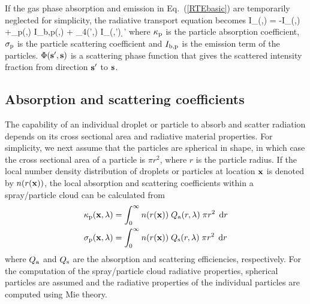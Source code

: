 If the gas phase absorption and emission in Eq.~(\ref{RTEbasic}) are temporarily neglected for simplicity, the radiative transport
equation becomes
\be
\bs \cdot \nabla I_{\la}(\bx,\bs) = -
I_{\la}(\bx,\bs) +\kappa_{\rm p}(\bx,\la) \; I_{{\rm b,p}}(\bx,\la) +
\int_{4\pi}\Phi(\bs',\bs) \; I_{\la}(\bx,\bs') \; \d\bs'
\label{RTEspray}
\ee
where $\kappa_{\rm p}$ is the particle absorption coefficient, $\sigma_{\rm p}$ is the
particle scattering coefficient and $I_{{\rm b,p}}$ is the emission
term of the particles. $\Phi({\mathbf{s}}',{\mathbf{s}})$ is a scattering phase function
that gives the scattered intensity fraction from direction ${\mathbf{s}}'$ to ${\mathbf{s}}$.\\

\subsection{Absorption and scattering coefficients}

The capability of an individual droplet or particle to absorb and scatter radiation depends on its cross sectional area and radiative material
properties. For simplicity, we next assume that the particles are spherical in shape, in which case the cross sectional area of a particle
is $\pi r^2$, where $r$ is the particle radius. If the local number density distribution of droplets or particles at location ${\mathbf{x}}$ is
denoted by $n(r({\mathbf{x}}))$, the local absorption and scattering coefficients within a spray/particle cloud can be calculated
from
\begin{align}
\kappa_{\rm p}(\bx,\la) &= \int_0^\infty n(r(\bx)) \; Q_{\rm a}(r,\la) \; \pi r^2 \; \d r \\ %
\sigma_{\rm p}(\bx,\la) &= \int_0^\infty n(r(\bx)) \; Q_{\rm s}(r,\la) \; \pi r^2 \; \d r    %
\end{align}
where $Q_{\rm a}$ and $Q_{\rm s}$ are the absorption and scattering efficiencies, respectively.
For the computation of the spray/particle cloud radiative properties,
spherical particles are assumed and the radiative properties of the individual particles
are computed using Mie theory.

